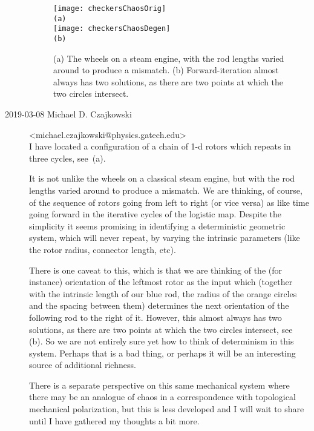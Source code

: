 \begin{description}
\begin{figure}[h]
    \begin{center}
\begin{minipage}[height=.20\textheight]{.75\textwidth}
\centering
\texttt{[image: checkersChaosOrig]}
\\
\small{\texttt{(a)}}
\\
\texttt{[image: checkersChaosDegen]}
\\
\small{\texttt{(b)}}
\end{minipage}
    \end{center}
\caption{\label{fig:checkersChaos}
(a)
    The wheels on a steam engine, with the rod lengths varied around to
    produce a mismatch.
(b)
    Forward-iteration almost always has two solutions, as there are two
    points at which the two circles intersect.
}
\end{figure}

    \item[2019-03-08 Michael D. Czajkowski]
<michael.czajkowski@physics.gatech.edu>\\
I have located a configuration of a chain of 1-d rotors which repeats in
three cycles, see \,(a).

It is not unlike the wheels on a classical
steam engine, but with the rod lengths varied around to produce a
mismatch.  We are thinking, of course, of the sequence of rotors going
from left to right (or vice versa) as like time going forward in the
iterative cycles of the logistic map.
Despite the simplicity it seems promising in identifying a
deterministic geometric system, which will never repeat, by varying the
intrinsic parameters (like the rotor radius, connector length, etc).

There is one caveat to this, which is that we are thinking of the (for
instance) orientation of the leftmost rotor as the input which (together
with the intrinsic length of our blue rod, the radius of the orange
circles and the spacing between them) determines the next orientation of
the following rod to the right of it. However, this almost always has two
solutions, as there are two points at which the two circles intersect,
see \,(b). So we are not entirely sure yet how
to think of determinism in this system. Perhaps that is a bad
thing, or perhaps it will be an interesting source of additional
richness.

There is a separate perspective on this same mechanical system where
there may be an analogue of chaos in a correspondence with topological
mechanical polarization, but this is less developed and I will wait to
share until I have gathered my thoughts a bit more.


\end{description}

